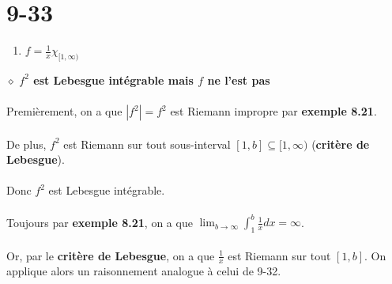 \documentclass[a4paper,10pt]{article}
\begin{document}
\section*{9-33}
\begin{enumerate}
	\item $f = \frac{1}{x} \chi_{[1,\infty)}$
\end{enumerate}
$\diamond$ \textbf{$f^2$ est Lebesgue intégrable mais $f$ ne l'est pas}
\\
\\
Premièrement, on a que $|f^2| = f^2$ est Riemann impropre par \textbf{exemple 8.21}.
\\
\\
De plus, $f^2$ est Riemann sur tout sous-interval $[1,b] \subseteq [1,\infty)$ (\textbf{critère de Lebesgue}).
\\
\\
Donc $f^2$ est Lebesgue intégrable.
\\
\\
Toujours par \textbf{exemple 8.21}, on a que $\lim_{b \to \infty} \int_1^b \frac{1}{x} dx = \infty$.
\\
\\
Or, par le \textbf{critère de Lebesgue}, on a que $\frac{1}{x}$ est Riemann sur tout $[1,b]$. On applique alors un raisonnement analogue à celui de 9-32.
\end{document}
